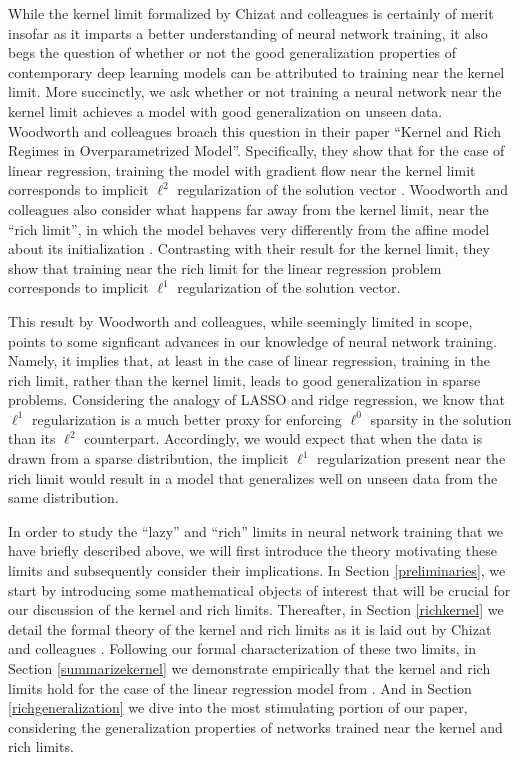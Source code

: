 \documentclass{article}
\begin{document}
While the kernel limit formalized by Chizat and colleagues is certainly of merit insofar as it imparts a better understanding of neural network training, it also begs the question of whether or not the good generalization properties of contemporary deep learning models can be attributed to training near the kernel limit. More succinctly, we ask whether or not training a neural network near the kernel limit achieves a model with good generalization on unseen data. Woodworth and colleagues broach this question in their paper \enquote{Kernel and Rich Regimes in Overparametrized Model}. Specifically, they show that for the case of linear regression, training the model with gradient flow near the kernel limit corresponds to implicit $\ell^2$ regularization of the solution vector \cite{woodworth2020kernel}. Woodworth and colleagues also consider what happens far away from the kernel limit, near the \enquote{rich limit}, in which the model behaves very differently from the affine model about its initialization \cite{woodworth2020kernel}. Contrasting with their result for the kernel limit, they show that training near the rich limit for the linear regression problem corresponds to implicit $\ell^1$ regularization of the solution vector.

This result by Woodworth and colleagues, while seemingly limited in scope, points to some signficant advances in our knowledge of neural network training. Namely, it implies that, at least in the case of linear regression, training in the rich limit, rather than the kernel limit, leads to good generalization in sparse problems. Considering the analogy of LASSO and ridge regression, we know that $\ell^1$ regularization is a much better proxy for enforcing $\ell^0$ sparsity in the solution than its $\ell^2$ counterpart. Accordingly, we would expect that when the data is drawn from a sparse distribution, the implicit $\ell^1$ regularization present near the rich limit would result in a model that generalizes well on unseen data from the same distribution.

In order to study the \enquote{lazy} and \enquote{rich} limits in neural network training that we have briefly described above, we will first introduce the theory motivating these limits and subsequently consider their implications. In Section \ref{preliminaries}, we start by introducing some mathematical objects of interest that will be crucial for our discussion of the kernel and rich limits. Thereafter, in Section \ref{richkernel} we detail the formal theory of the kernel and rich limits as it is laid out by Chizat and colleagues \cite{chizat2018lazy}. Following our formal characterization of these two limits, in Section \ref{summarizekernel} we demonstrate empirically that the kernel and rich limits hold for the case of the linear regression model from \cite{woodworth2020kernel}. And in Section \ref{richgeneralization} we dive into the most stimulating portion of our paper, considering the generalization properties of networks trained near the kernel and rich limits.
\end{document}
